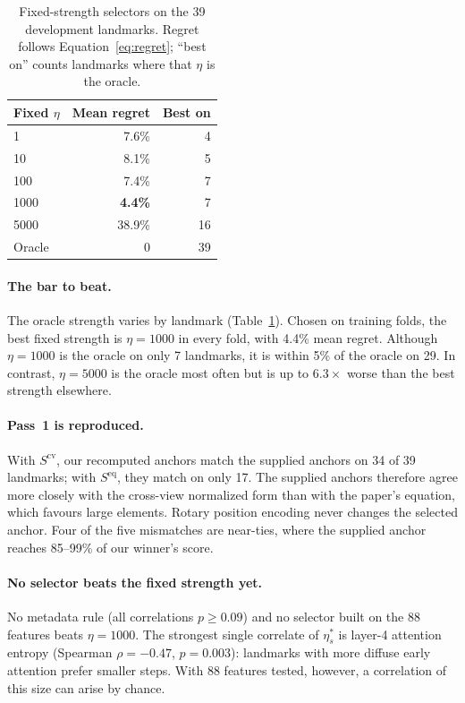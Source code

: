 \documentclass[sigconf,nonacm]{acmart}
\begin{document}
\begin{table}[htb]
\caption{Fixed-strength selectors on the 39 development landmarks. Regret follows Equation~\ref{eq:regret}; ``best on'' counts landmarks where that $\eta$ is the oracle.}
\label{tab:eric-regret}
\centering
\begin{tabular}{lrr}
\toprule
Fixed $\eta$ & Mean regret & Best on\\
\midrule
1 & 7.6\% & 4\\
10 & 8.1\% & 5\\
100 & 7.4\% & 7\\
1000 & \textbf{4.4\%} & 7\\
5000 & 38.9\% & 16\\
Oracle & 0 & 39\\
\bottomrule
\end{tabular}
\end{table}

\paragraph{The bar to beat.} The oracle strength varies by landmark (Table~\ref{tab:eric-regret}). Chosen on training folds, the best fixed strength is $\eta=1000$ in every fold, with 4.4\% mean regret. Although $\eta=1000$ is the oracle on only 7 landmarks, it is within 5\% of the oracle on 29. In contrast, $\eta=5000$ is the oracle most often but is up to $6.3\times$ worse than the best strength elsewhere.

\paragraph{Pass~1 is reproduced.} With $S^{\mathrm{cv}}$, our recomputed anchors match the supplied anchors on 34 of 39 landmarks; with $S^{\mathrm{eq}}$, they match on only 17. The supplied anchors therefore agree more closely with the cross-view normalized form than with the paper's equation, which favours large elements. Rotary position encoding never changes the selected anchor. Four of the five mismatches are near-ties, where the supplied anchor reaches 85--99\% of our winner's score.

\paragraph{No selector beats the fixed strength yet.} No metadata rule (all correlations $p\ge0.09$) and no selector built on the 88 features beats $\eta=1000$. The strongest single correlate of $\eta^*_s$ is layer-4 attention entropy (Spearman $\rho=-0.47$, $p=0.003$): landmarks with more diffuse early attention prefer smaller steps. With 88 features tested, however, a correlation of this size can arise by chance.
\end{document}
